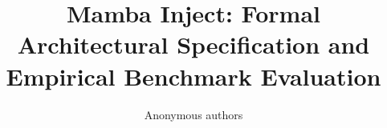 \title{\textbf{Mamba Inject: Formal Architectural Specification and Empirical Benchmark Evaluation}}

\author{Anonymous authors}
